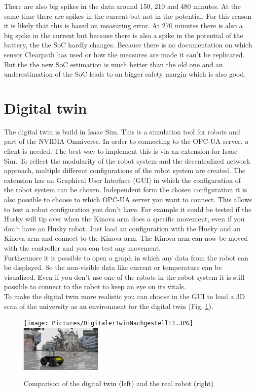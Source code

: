 \documentclass[conference]{IEEEtran}
\begin{document}
There are also big spikes in the data around 150, 210 and 480 minutes. At the same time there are spikes in the current but not in the potential.
For this reason it is likely that this is based on measuring error.
At 270 minutes there is also a big spike in the current but because there is also a spike in the potential of the battery, the the SoC hardly changes.
Because there is no documentation on which sensor Clearpath has used or how the measures are made it can't be replicated.
But the the new SoC estimation is much better than the old one and an underestimation of the SoC leads to an bigger safety margin which is also good.
\section{Digital twin}
The digital twin is build in Isaac Sim.
This is a simulation tool for robots and part of the NVIDIA Omniverse.
In order to connecting to the OPC-UA server, a client is needed.
The best way to implement this is via an extension for Isaac Sim.
To reflect the modularity of the robot system and the decentralized network approach, multiple different configurations of the robot system are created.
The extension has an Graphical User Interface (GUI) in which the configuration of the robot system can be chosen.
Independent form the chosen configuration it is also possible to choose to which OPC-UA server you want to connect.
This allows to test a robot configuration you don't have. 
For example it could be tested if the Husky will tip over when the Kinova arm does a specific movement, even if you don't have an Husky robot.
Just load an configuration with the Husky and an Kinova arm and connect to the Kinova arm.
The Kinova arm can now be moved with the controller and you can test any movement.\\
Furthermore it is possible to open a graph in which any data from the robot can be displayed.
So the non-visible data like current or temperature can be visualized.
Even if you don't use one of the robots in the robot system it is still possible to connect to the robot to keep an eye on its vitals.\\
To make the digital twin more realistic you can choose in the GUI to load a 3D scan of the university as an environment for the digital twin (Fig. \ref{fig:CompareDigitalReal}).
\begin{figure}[htbp]
    \centerline{\texttt{[image: Pictures/DigitalerTwinNachgestellt1.JPG]}\includegraphics[width=4cm]{Pictures/DigitalerTwinNachgestellt2.png}}
    \caption{Comparison of the digital twin (left) and the real robot (right)}
    \label{fig:CompareDigitalReal}
\end{figure}
\end{document}
